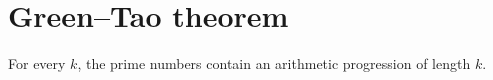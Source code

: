 \section{Green--Tao theorem}

\begin{theorem}
\label{thm:green-tao}
\notready
For every $k$, the prime numbers contain an arithmetic progression of length $k$.
\end{theorem}
